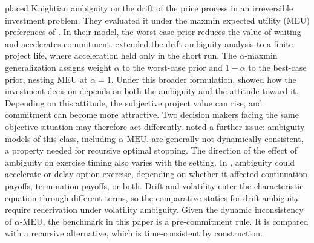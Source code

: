 \documentclass[5p,times,authoryear]{elsarticle}
\theoremstyle{plain}
\newcommand{\aMEU}{\alpha\text{-MEU}}
\begin{document}
\citet{NishimuraOzaki2007} placed Knightian ambiguity on the drift of the price process in an irreversible investment problem. They evaluated it under the maxmin expected utility (MEU) preferences of \citet{GilboaSchmeidler1989}. In their model, the worst-case prior reduces the value of waiting and accelerates commitment. \citet{TrojanowskaKort2010} extended the drift-ambiguity analysis to a finite project life, where acceleration held only in the short run. The $\alpha$-maxmin generalization \citep{Ghirardato2004} assigns weight $\alpha$ to the worst-case prior and $1-\alpha$ to the best-case prior, nesting MEU at $\alpha=1$. Under this broader formulation, \citet{Schroder2011} showed how the investment decision depends on both the ambiguity and the attitude toward it. Depending on this attitude, the subjective project value can rise, and commitment can become more attractive. Two decision makers facing the same objective situation may therefore act differently. \citet{Schroder2020} noted a further issue: ambiguity models of this class, including $\aMEU$, are generally not dynamically consistent, a property needed for recursive optimal stopping. The direction of the effect of ambiguity on exercise timing also varies with the setting. In \citet{MiaoWang2011}, ambiguity could accelerate or delay option exercise, depending on whether it affected continuation payoffs, termination payoffs, or both. Drift and volatility enter the characteristic equation through different terms, so the comparative statics for drift ambiguity require rederivation under volatility ambiguity. Given the dynamic inconsistency of $\aMEU$, the benchmark in this paper is a pre-commitment rule. It is compared with a recursive alternative, which is time-consistent by construction.
\end{document}
